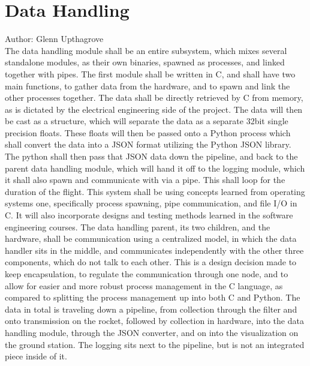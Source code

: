 \documentclass[onecolumn, draftclsnofoot,10pt, compsoc]{IEEEtran}
\begin{document}
\section {Data Handling}
Author: Glenn Upthagrove \\
The data handling module shall be an entire subsystem, which mixes several standalone modules, as their own binaries, spawned as processes, and linked together with pipes. The first module shall be written in C, and shall have two main functions, to gather data from the hardware, and to spawn and link the other processes together. The data shall be directly retrieved by C from memory, as is dictated by the electrical engineering side of the project. The data will then be cast as a structure, which will separate the data as a separate 32bit single precision floats. These floats will then be passed onto a Python process which shall convert the data into a JSON format utilizing the Python JSON library. The python shall then pass that JSON data down the pipeline, and back to the parent data handling module, which will hand it off to the logging module, which it shall also spawn and communicate with via a pipe. This shall loop for the duration of the flight. This system shall be using concepts learned from operating systems one, specifically process spawning, pipe communication, and file I/O in C. It will also incorporate designs and testing methods learned in the software engineering courses. \cite{refjson} \cite{refpython} 
The data handling parent, its two children, and the hardware, shall be communication using a centralized model, in which the data handler sits in the middle, and communicates independently with the other three components, which do not talk to each other. This is a design decision made to keep encapsulation, to regulate the communication through one node, and to allow for easier and more robust process management in the C language, as compared to splitting the process management up into both C and Python. The data in total is traveling down a pipeline, from collection through the filter and onto transmission on the rocket, followed by collection in hardware, into the data handling module, through the JSON converter, and on into the visualization on the ground station. The logging sits next to the pipeline, but is not an integrated piece inside of it. 
\end{document}
